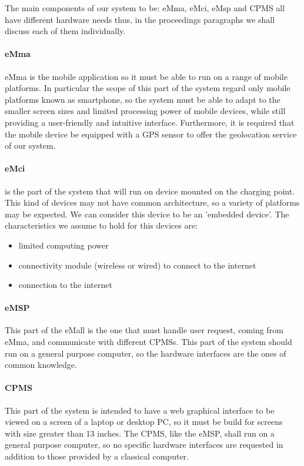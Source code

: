 The main components of our system to be: eMma, eMci, eMsp and CPMS all have different hardware needs thus, in the proceedings paragraphs we shall discuss each of them individually.

\paragraph{eMma} eMma is the mobile application so it must be able to run on a range of mobile platforms. In particular the scope of this part of the system regard only mobile platforms known as smartphone, so the system must be able to adapt to the smaller screen sizes and limited processing power of mobile devices, while still providing a user-friendly and intuitive interface. Furthermore, it is required that the mobile device be equipped with a GPS sensor to offer the geolocation service of our system.

\paragraph{eMci} is the part of the system that will run on device mounted on the charging point. This kind of devices may not have common architecture, so a variety of platforms may be expected. We can consider this device to be an 'embedded device'. The characteristics we assume to hold for this devices are:
\begin{itemize}
    \item limited computing power
    \item connectivity module (wireless or wired) to connect to the internet
    \item connection to the internet
\end{itemize}

\paragraph{eMSP} This part of the eMall is the one that must handle user request, coming from eMma, and communicate with different CPMSs. This part of the system should run on a general purpose computer, so the hardware interfaces are the ones of common knowledge.

\paragraph{CPMS} This part of the system is intended to have a web graphical interface to be viewed on a screen of a laptop or desktop PC, so it must be build for screens with size greater than 13 inches. The CPMS, like the eMSP, shall run on a general purpose computer, so no specific hardware interfaces are requested in addition to those provided by a classical computer.
